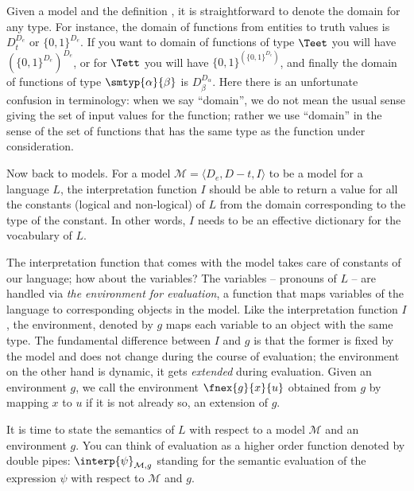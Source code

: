 \documentclass[11pt,a4paper]{article}
\begin{document}
Given a model and the definition , it is straightforward to denote the domain for any type. For instance, the domain of functions from entities to truth values is $D_t^{D_e}$ or $\{0,1\}^{D_e}$. If  you want to domain of functions of type $\Teet$ you will have  $(\{0,1\}^{D_e})^{D_e}$, or for $\Tett$ you will have $\{0,1\}^{(\{0,1\}^{D_e})}$, and finally the domain of functions of type $\smtyp{\alpha}{\beta}$ is $D_{\beta}^{D_{\alpha}}$. Here there is an unfortunate confusion in terminology: when we say ``domain'', we do not mean the usual sense giving the set of input values for the function; rather we use ``domain'' in the sense of the set of functions that has the same type as the function under consideration.

Now back to models. For a model  $\mathcal{M} = \langle D_e, D-t, I \rangle$ to be a model for a language $L$, the interpretation function $I$ should be able to return a value for all the constants (logical and non-logical) of $L$ from the domain corresponding to the type of the constant. In other words, $I$ needs to be an effective dictionary for the vocabulary of $L$. 
 
The interpretation function that comes with the model takes care of constants of our language; how about the variables? The variables -- pronouns of $L$ -- are handled via \emph{the environment for evaluation}, a function that maps variables of the language to corresponding objects in the model. Like the interpretation function $I$, the environment, denoted by $g$ maps each variable to an object with the same type. The fundamental difference between $I$ and $g$ is that the former is fixed by the model and does not change during the course of evaluation; the environment on the other hand is dynamic, it gets \emph{extended} during evaluation. Given an environment $g$, we call the environment $\fnex{g}{x}{u}$ obtained from $g$ by mapping $x$ to $u$ if it is not already so, an extension of $g$. 

It is time to state the semantics of $L$ with respect to a model $\mathcal{M}$ and an environment $g$. You can think of evaluation as a higher order function denoted by double pipes: $\interp{\psi}_{\mathcal{M},g}$ standing for the semantic evaluation of the expression $\psi$ with respect to $\mathcal{M}$ and $g$.
\end{document}
